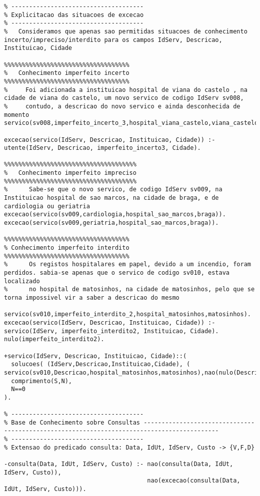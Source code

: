 \documentclass[
  oneside,
  10pt, a4paper,
  footinclude=true,
  headinclude=true,
  cleardoublepage=empty
]{scrbook}
\begin{document}
\begin{lstlisting}
% -------------------------------------
% Explicitacao das situacoes de excecao
% -------------------------------------
%   Consideramos que apenas sao permitidas situacoes de conhecimento incerto/impreciso/interdito para os campos IdServ, Descricao, Instituicao, Cidade

%%%%%%%%%%%%%%%%%%%%%%%%%%%%%%%%%%%
%   Conhecimento imperfeito incerto
%%%%%%%%%%%%%%%%%%%%%%%%%%%%%%%%%%%
%     Foi adicionada a instituicao hospital de viana do castelo , na cidade de viana do castelo, um novo servico de codigo IdServ sv008,
%     contudo, a descricao do novo servico e ainda desconhecida de momento
servico(sv008,imperfeito_incerto_3,hospital_viana_castelo,viana_castelo).

excecao(servico(IdServ, Descricao, Instituicao, Cidade)) :- utente(IdServ, Descricao, imperfeito_incerto3, Cidade).

%%%%%%%%%%%%%%%%%%%%%%%%%%%%%%%%%%%%%
%   Conhecimento imperfeito impreciso
%%%%%%%%%%%%%%%%%%%%%%%%%%%%%%%%%%%%%
%      Sabe-se que o novo servico, de codigo IdServ sv009, na Instituicao hospital de sao marcos, na cidade de braga, e de cardiologia ou geriatria 
excecao(servico(sv009,cardiologia,hospital_sao_marcos,braga)).
excecao(servico(sv009,geriatria,hospital_sao_marcos,braga)).

%%%%%%%%%%%%%%%%%%%%%%%%%%%%%%%%%%%
% Conhecimento imperfeito interdito
%%%%%%%%%%%%%%%%%%%%%%%%%%%%%%%%%%%
%      Os registos hospitalares em papel, devido a um incendio, foram perdidos. sabia-se apenas que o servico de codigo sv010, estava localizado 
%      no hospital de matosinhos, na cidade de matosinhos, pelo que se torna impossivel vir a saber a descricao do mesmo 

servico(sv010,imperfeito_interdito_2,hospital_matosinhos,matosinhos).
excecao(servico(IdServ, Descricao, Instituicao, Cidade)) :- servico(IdServ, imperfeito_interdito2, Instituicao, Cidade).
nulo(imperfeito_interdito2).

+servico(IdServ, Descricao, Instituicao, Cidade)::(
  solucoes( (IdServ,Descricao,Instituicao,Cidade), ( servico(sv010,Descricao,hospital_matosinhos,matosinhos),nao(nulo(Descricao))),S),
  comprimento(S,N),
  N==0
).

% -------------------------------------
% Base de Conhecimento sobre Consultas -------------------------------------------------------------------------------------------
% -------------------------------------
% Extensao do predicado consulta: Data, IdUt, IdServ, Custo -> {V,F,D}

-consulta(Data, IdUt, IdServ, Custo) :- nao(consulta(Data, IdUt, IdServ, Custo)),
                                        nao(excecao(consulta(Data, IdUt, IdServ, Custo))).


\end{lstlisting}
\end{document}
